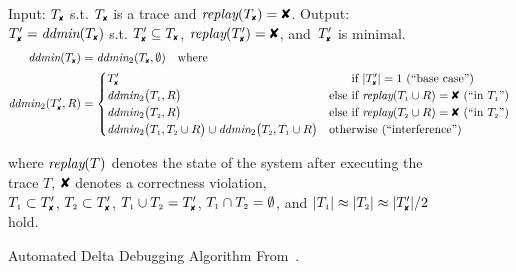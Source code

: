 \begin{figure}[t]
\footnotesize
\begin{boxedminipage}{\textwidth}
Input: $\cfail$ s.t. $\cfail$ is a trace and $\test(\cfail) = \DFAIL$. Output: $\dfail
= \ddmin(\cfail)$ s.t. $\dfail \subseteq
\cfail$, $\test(\dfail) = \DFAIL$, and~$\dfail$ is minimal.
\begin{align*}
\ddmin(\cfail) &= \ddmin_2(\cfail, \emptyset) \quad \text{where} \\
\ddmin_2(\dfail, R) &=
\begin{cases}
\dfail & \text{\hphantom{else }if $|\dfail| = 1$ (``base case'')} \\
\ddmin_2\bigl(\done, R\bigr) &
\text{else if $\test(\done \cup R) = \DFAIL$ (``in $\done$'')} \\
\ddmin_2\bigl(\dtwo, R\bigr) &
\text{else if $\test(\dtwo \cup R) = \DFAIL$ (``in $\dtwo$'')} \\
\ddmin_2\bigl(\done, \dtwo \cup R\bigr) \cup \ddmin_2\bigl(\dtwo, \done \cup
R\bigr) & \text{otherwise (``interference'')}
\end{cases}
\end{align*}
\begin{center}
where $\textit{replay}(T)$ denotes the state of the system after executing the trace $T$,
$\DFAIL$ denotes a correctness violation, \\
$\done \subset \dfail$, $\dtwo \subset \dfail$, $\done \cup \dtwo = \dfail$, ${T_{\scriptscriptstyle 1}} \cap
{T_{\scriptscriptstyle 2}} = \emptyset$, and $|\done| \approx |\dtwo| \approx |\dfail| / 2$
hold.
\end{center}
\end{boxedminipage}
\caption{ Automated Delta Debugging Algorithm
From~\cite{Zeller:1999:YMP:318773.318946}.}
\label{fig:ddmin}
\vspace{-0.3cm}
\end{figure}

